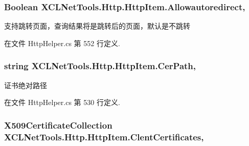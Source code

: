 \hypertarget{class_x_c_l_net_tools_1_1_http_1_1_http_item_a60ff89a364c32983810266a814e8fb2b}{
\subsubsection[{Allowautoredirect}]{\setlength{\rightskip}{0pt plus 5cm}Boolean X\-C\-L\-Net\-Tools.\-Http.\-Http\-Item.\-Allowautoredirect\hspace{0.3cm}{\ttfamily [get]}, {\ttfamily [set]}}}\label{class_x_c_l_net_tools_1_1_http_1_1_http_item_a60ff89a364c32983810266a814e8fb2b}


支持跳转页面，查询结果将是跳转后的页面，默认是不跳转 



在文件 Http\-Helper.\-cs 第 552 行定义.

\hypertarget{class_x_c_l_net_tools_1_1_http_1_1_http_item_a2a500cb7819053bff9e48a50cfd987ca}{
\subsubsection[{Cer\-Path}]{\setlength{\rightskip}{0pt plus 5cm}string X\-C\-L\-Net\-Tools.\-Http.\-Http\-Item.\-Cer\-Path\hspace{0.3cm}{\ttfamily [get]}, {\ttfamily [set]}}}\label{class_x_c_l_net_tools_1_1_http_1_1_http_item_a2a500cb7819053bff9e48a50cfd987ca}


证书绝对路径 



在文件 Http\-Helper.\-cs 第 530 行定义.

\hypertarget{class_x_c_l_net_tools_1_1_http_1_1_http_item_a5f720ce1c69320ec28f2c8de373f52a0}{
\subsubsection[{Clent\-Certificates}]{\setlength{\rightskip}{0pt plus 5cm}X509\-Certificate\-Collection X\-C\-L\-Net\-Tools.\-Http.\-Http\-Item.\-Clent\-Certificates\hspace{0.3cm}{\ttfamily [get]}, {\ttfamily [set]}}}\label{class_x_c_l_net_tools_1_1_http_1_1_http_item_a5f720ce1c69320ec28f2c8de373f52a0}



